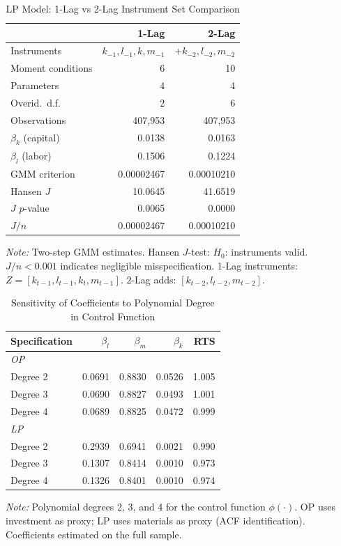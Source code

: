 \documentclass[a4paper, 12pt]{article}
\begin{document}
\begin{table}[htbp]
\centering
\caption{LP Model: 1-Lag vs 2-Lag Instrument Set Comparison}
\label{tab:lp_lag}
\begin{tabular}{lrr}
\toprule
 & 1-Lag & 2-Lag \\
\midrule
Instruments & $k_{-1}, l_{-1}, k, m_{-1}$ & $+ k_{-2}, l_{-2}, m_{-2}$ \\
Moment conditions & 6 & 10 \\
Parameters & 4 & 4 \\
Overid.\ d.f. & 2 & 6 \\
Observations & 407,953 & 407,953 \\
\midrule
$\beta_k$ (capital) & 0.0138 & 0.0163 \\
$\beta_l$ (labor) & 0.1506 & 0.1224 \\
\midrule
GMM criterion & 0.00002467 & 0.00010210 \\
Hansen $J$ & 10.0645 & 41.6519 \\
$J$ $p$-value & 0.0065 & 0.0000 \\
$J/n$ & 0.00002467 & 0.00010210 \\
\bottomrule
\end{tabular}
\begin{flushleft}
\footnotesize
\textit{Note:} Two-step GMM estimates. Hansen $J$-test: $H_0$: instruments valid.
$J/n < 0.001$ indicates negligible misspecification.
1-Lag instruments: $Z = [k_{t-1}, l_{t-1}, k_t, m_{t-1}]$.
2-Lag adds: $[k_{t-2}, l_{t-2}, m_{t-2}]$.
\end{flushleft}
\end{table}

\begin{table}[htbp]
\centering
\caption{Sensitivity of Coefficients to Polynomial Degree in Control Function}
\label{tab:poly_sensitivity}
\begin{tabular}{lrrrr}
\toprule
Specification & $\beta_l$ & $\beta_m$ & $\beta_k$ & RTS \\
\midrule
\multicolumn{5}{l}{\textit{OP}} \\
  \quad Degree 2 & 0.0691 & 0.8830 & 0.0526 & 1.005 \\
  \quad Degree 3 & 0.0690 & 0.8827 & 0.0493 & 1.001 \\
  \quad Degree 4 & 0.0689 & 0.8825 & 0.0472 & 0.999 \\
\midrule
\multicolumn{5}{l}{\textit{LP}} \\
  \quad Degree 2 & 0.2939 & 0.6941 & 0.0021 & 0.990 \\
  \quad Degree 3 & 0.1307 & 0.8414 & 0.0010 & 0.973 \\
  \quad Degree 4 & 0.1326 & 0.8401 & 0.0010 & 0.974 \\
\bottomrule
\end{tabular}
\begin{flushleft}
\footnotesize
\textit{Note:} Polynomial degrees 2, 3, and 4 for the control function $\phi(\cdot)$.
OP uses investment as proxy; LP uses materials as proxy (ACF identification).
Coefficients estimated on the full sample.
\end{flushleft}
\end{table}
\end{document}
